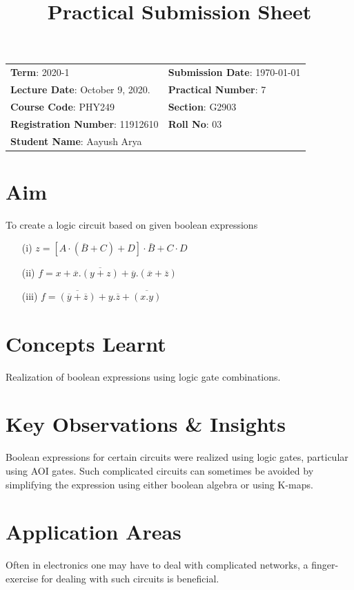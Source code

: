 \documentclass{article}
\title{Practical Submission Sheet}
\date{}
\newcommand{\bb}[1]{\textbf{#1}}
\newcommand{\ol}[1]{\overline{#1}}
\begin{document}
	\maketitle
	\begin{tabular}{ll}
		\bb{Term}: 2020-1 & \bb{Submission Date}: \today\\
		\bb{Lecture Date}: October 9, 2020. & \bb{Practical Number}: 7\\
		\bb{Course Code}: PHY249 & \bb{Section}: G2903\\
		\bb{Registration Number}: 11912610 & \bb{Roll No}: 03\\
		\bb{Student Name}: Aayush Arya & \\
	\end{tabular}
	
	\section*{Aim} To create a logic circuit based on given boolean expressions
	\begin{itemize}
		\item[(i)] $z = [A\cdot (\ol{B} + C) + D]\cdot \bar{B} + C \cdot D$
		\item[(ii)] $ f = x + \ol{x}.\ol{(y+z)} +\ol{y}.(\ol{x} + \ol{z})$
		\item[(iii)] $f =\ol{(\ol{y} + \ol{z})} + y.\ol{z} +  \ol{(x.y)}$ 
	\end{itemize}

	\section*{Concepts Learnt}	
	Realization of boolean expressions using logic gate combinations.
	
	\section*{Key Observations \& Insights}
	Boolean expressions for certain circuits were realized using logic gates, particular using AOI gates. Such complicated circuits can sometimes be avoided by simplifying the expression using either boolean algebra or using K-maps.
	
	\section*{Application Areas}
	Often in electronics one may have to deal with complicated networks, a finger-exercise for dealing with such circuits is beneficial.
	
\end{document}
